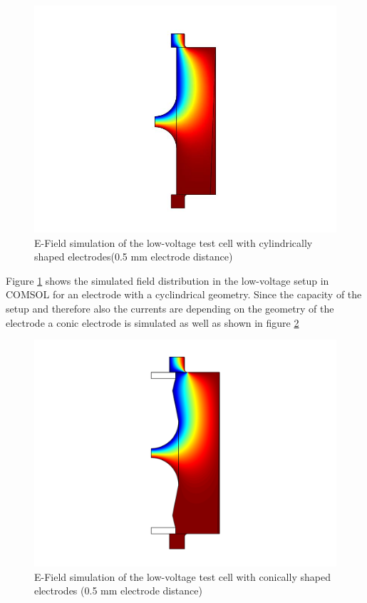 \begin{figure}[htbp]
	\centering
	\includegraphics{figures/COMSOL_Beispielbild.jpg}		
	\caption[Kurze Abbildungsbeschreibung]{E-Field simulation of the low-voltage test cell with cylindrically shaped electrodes(0.5 mm electrode distance)} \label{fig.comsol_beispiel}

\end{figure}
 
Figure \ref{fig.comsol_beispiel} shows the simulated field distribution in the low-voltage setup in COMSOL for an electrode with a cyclindrical geometry. Since the capacity of the setup and therefore also the currents are depending on the geometry of the electrode a conic electrode is simulated as well as shown in figure  \ref{fig.comsol_conic}

\begin{figure}[htbp]
	\centering
	\includegraphics[scale=0.3]{figures/Method/Part1_d_C0/conic.png}		
	\caption[Kurze Abbildungsbeschreibung]{E-Field simulation of the low-voltage test cell with conically shaped electrodes (0.5 mm electrode distance)} \label{fig.comsol_conic}

\end{figure}

